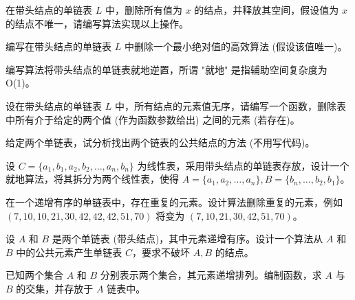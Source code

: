 \begin{qitems}

    \begin{bbox}
        \qitem 在带头结点的单链表 $L$ 中，删除所有值为 $x$ 的结点，并释放其空间，假设值为 $x$ 的结点不唯一，请编写算法实现以上操作。
    \end{bbox}

    \begin{bbox}
        \qitem 编写在带头结点的单链表 $L$ 中删除一个最小绝对值的高效算法 (假设该值唯一)。
    \end{bbox}

    \begin{bbox}
        \qitem 编写算法将带头结点的单链表就地逆置，所谓 "就地" 是指辅助空间复杂度为 O(1)。
    \end{bbox}

    \begin{bbox}
        \qitem 设在带头结点的单链表 $L$ 中，所有结点的元素值无序，请编写一个函数，删除表中所有介于给定的两个值 (作为函数参数给出) 之间的元素 (若存在)。
    \end{bbox}

    \begin{bbox}
        \qitem 给定两个单链表，试分析找出两个链表的公共结点的方法 (不用写代码)。
    \end{bbox}

    \begin{bbox}
        \qitem 设 $C = \{a_1, b_1, a_2, b_2, \dots, a_n, b_n\}$ 为线性表，采用带头结点的单链表存放，设计一个就地算法，将其拆分为两个线性表，使得 $A = \{a_1, a_2, \dots, a_n\}, B = \{b_n, \dots, b_2, b_1\}$。
    \end{bbox}

    \begin{bbox}
        \qitem 在一个递增有序的单链表中，存在重复的元素。设计算法删除重复的元素，例如 $(7, 10, 10, 21, 30, 42, 42, 42, 51, 70)$ 将变为 $(7, 10, 21, 30, 42, 51, 70)$。
    \end{bbox}

    \begin{bbox}
        \qitem 设 $A$ 和 $B$ 是两个单链表 (带头结点)，其中元素递增有序。设计一个算法从 $A$ 和 $B$ 中的公共元素产生单链表 $C$，要求不破坏 $A, B$ 的结点。
    \end{bbox}

    \begin{bbox}
        \qitem 已知两个集合 $A$ 和 $B$ 分别表示两个集合，其元素递增排列。编制函数，求 $A$ 与 $B$ 的交集，并存放于 $A$ 链表中。
    \end{bbox}


\end{qitems}
